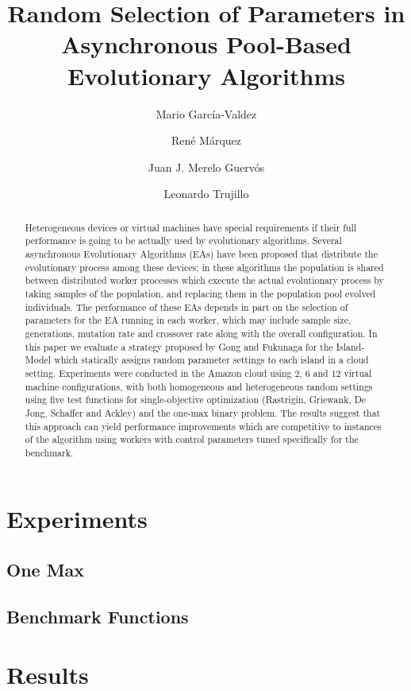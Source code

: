 \documentclass{llncs}
\begin{document}
\sloppy

\title{Random Selection of Parameters in Asynchronous Pool-Based Evolutionary Algorithms}

\author{Mario Garc\'ia-Valdez \and Ren\'e M\'arquez \and Juan J. Merelo Guerv\'os \and  Leonardo Trujillo }


\maketitle

\begin{abstract}
Heterogeneous devices or virtual machines have special requirements if
their full performance is going to be actually used by evolutionary
algorithms. Several asynchronous Evolutionary Algorithms (EAs) have
been proposed that distribute the evolutionary process among these
devices; in these algorithms the population is shared between
distributed worker processes which execute the actual evolutionary
process by taking samples of the population, and replacing them in the
population pool evolved individuals. The performance of these EAs
depends in part on the selection of parameters for the EA running in
each worker, which may include sample size, generations, mutation rate
and crossover rate along with the overall configuration. In this paper
we evaluate a strategy proposed by Gong and Fukunaga for the
Island-Model which statically assigns random parameter settings to
each island in a cloud setting. Experiments were conducted in the
Amazon cloud using 2, 6 and 12 virtual machine configurations, with
both homogeneous and heterogeneous random settings using five 
test functions for single-objective optimization (Rastrigin, Griewank, De Jong, Schaffer 
and Ackley) and the one-max binary problem. The results suggest that this approach can yield
performance improvements which are competitive to instances of the
algorithm using workers with control parameters tuned specifically for
the benchmark.

\end{abstract}

\section{Experiments}
\subsection{One Max}

\subsection{Benchmark Functions}
\section{Results}
\end{document}
